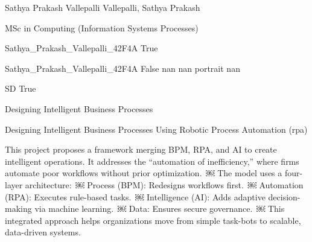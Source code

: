 \documentclass[twoside]{report}
\begin{document}
\begingroup{}\relax



\def\Key{Sathya_Prakash_Vallepalli_42F4A}

{Sathya Prakash Vallepalli}
{Vallepalli, Sathya Prakash}

{MSc in Computing (Information Systems Processes)}

{Sathya_Prakash_Vallepalli_42F4A}
{True}

{Sathya_Prakash_Vallepalli_42F4A}
{False}
{nan}
{nan}
{portrait}
{nan}

{SD}
{True}

{Designing Intelligent Business Processes}

{Designing Intelligent Business Processes Using Robotic Process Automation (rpa)}

{This project proposes a framework merging BPM, RPA, and AI to create intelligent operations. It addresses the \textquotedblleft{}automation of inefficiency,\textquotedblright{} where firms automate poor workflows without prior optimization. ￼
The model uses a four-layer architecture: ￼
\ITEM Process (BPM): Redesigns workflows first. ￼
\ITEM Automation (RPA): Executes rule-based tasks. ￼
\ITEM Intelligence (AI): Adds adaptive decision-making via machine learning. ￼
\ITEM Data: Ensures secure governance. ￼
This integrated approach helps organizations move from simple task-bots to scalable, data-driven systems.}
\end{document}
